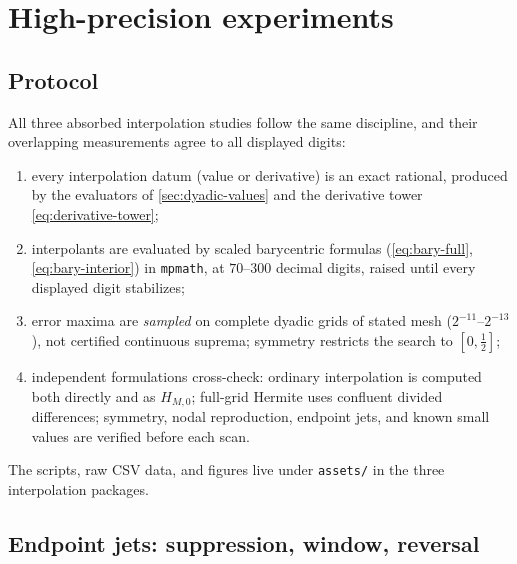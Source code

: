 \section{High-precision experiments}
\label{sec:numerics-interp}

\subsection{Protocol}

All three absorbed interpolation studies follow the same discipline,
and their overlapping measurements agree to all displayed digits:
\begin{enumerate}
\item every interpolation datum (value or derivative) is an exact
rational, produced by the evaluators of \cref{sec:dyadic-values} and
the derivative tower \eqref{eq:derivative-tower};
\item interpolants are evaluated by scaled barycentric formulas
(\eqref{eq:bary-full}, \eqref{eq:bary-interior}) in
\texttt{mpmath}, at $70$--$300$ decimal digits, raised until every
displayed digit stabilizes;
\item error maxima are \emph{sampled} on complete dyadic grids of
stated mesh ($2^{-11}$--$2^{-13}$), not certified continuous suprema;
symmetry restricts the search to $[0,\tfrac12]$;
\item independent formulations cross-check: ordinary interpolation is
computed both directly and as $H_{M,0}$; full-grid Hermite uses
confluent divided differences; symmetry, nodal reproduction, endpoint
jets, and known small values are verified before each scan.
\end{enumerate}
The scripts, raw CSV data, and figures live under
\nolinkurl{assets/} in the three interpolation packages.

\subsection{Endpoint jets: suppression, window, reversal}

